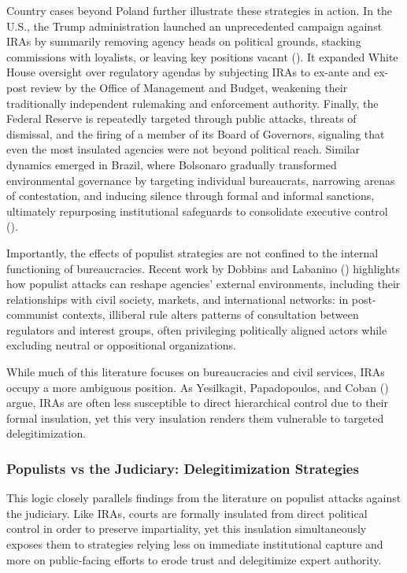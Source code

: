 \documentclass[
  11pt,
  letterpaper,
  DIV=11,
  numbers=noendperiod]{scrartcl}
\begin{document}
Country cases beyond Poland further illustrate these strategies in
action. In the U.S., the Trump administration launched an unprecedented
campaign against IRAs by summarily removing agency heads on political
grounds, stacking commissions with loyalists, or leaving key positions
vacant (). It
expanded White House oversight over regulatory agendas by subjecting
IRAs to ex-ante and ex-post review by the Office of Management and
Budget, weakening their traditionally independent rulemaking and
enforcement authority. Finally, the Federal Reserve is repeatedly
targeted through public attacks, threats of dismissal, and the firing of
a member of its Board of Governors, signaling that even the most
insulated agencies were not beyond political reach. Similar dynamics
emerged in Brazil, where Bolsonaro gradually transformed environmental
governance by targeting individual bureaucrats, narrowing arenas of
contestation, and inducing silence through formal and informal
sanctions, ultimately repurposing institutional safeguards to
consolidate executive control ().

Importantly, the effects of populist strategies are not confined to the
internal functioning of bureaucracies. Recent work by Dobbins and
Labanino () highlights how populist
attacks can reshape agencies' external environments, including their
relationships with civil society, markets, and international networks:
in post-communist contexts, illiberal rule alters patterns of
consultation between regulators and interest groups, often privileging
politically aligned actors while excluding neutral or oppositional
organizations.

While much of this literature focuses on bureaucracies and civil
services, IRAs occupy a more ambiguous position. As Yesilkagit,
Papadopoulos, and Coban () argue,
IRAs are often less susceptible to direct hierarchical control due to
their formal insulation, yet this very insulation renders them
vulnerable to targeted delegitimization.

\subsubsection{Populists vs the Judiciary: Delegitimization
Strategies}\label{populists-vs-the-judiciary-delegitimization-strategies}

This logic closely parallels findings from the literature on populist
attacks against the judiciary. Like IRAs, courts are formally insulated
from direct political control in order to preserve impartiality, yet
this insulation simultaneously exposes them to strategies relying less
on immediate institutional capture and more on public-facing efforts to
erode trust and delegitimize expert authority.
\end{document}
